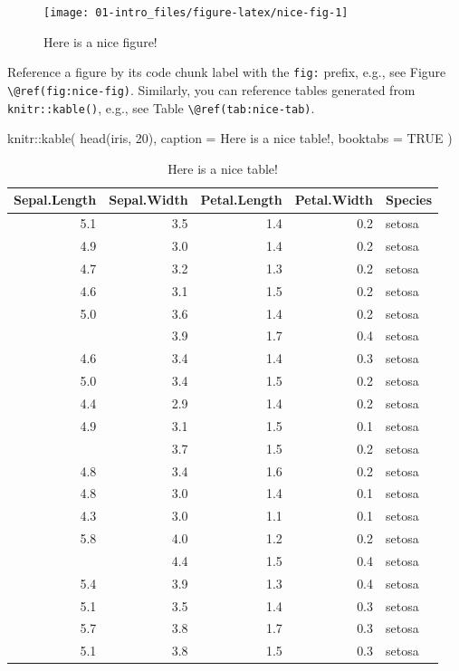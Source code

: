 \documentclass[
]{book}
\newenvironment{Shaded}{\begin{snugshade}}{\end{snugshade}}
\newcommand{\AttributeTok}[1]{\textcolor[rgb]{0.77,0.63,0.00}{#1}}
\newcommand{\ConstantTok}[1]{\textcolor[rgb]{0.00,0.00,0.00}{#1}}
\newcommand{\DecValTok}[1]{\textcolor[rgb]{0.00,0.00,0.81}{#1}}
\newcommand{\FunctionTok}[1]{\textcolor[rgb]{0.00,0.00,0.00}{#1}}
\newcommand{\NormalTok}[1]{#1}
\newcommand{\SpecialCharTok}[1]{\textcolor[rgb]{0.00,0.00,0.00}{#1}}
\newcommand{\StringTok}[1]{\textcolor[rgb]{0.31,0.60,0.02}{#1}}
\begin{document}
\begin{figure}

{\centering \texttt{[image: 01-intro\_files/figure-latex/nice-fig-1]} 

}

\caption{Here is a nice figure!}\label{fig:nice-fig}
\end{figure}

Reference a figure by its code chunk label with the \texttt{fig:} prefix, e.g., see Figure \texttt{\textbackslash{}@ref(fig:nice-fig)}. Similarly, you can reference tables generated from \texttt{knitr::kable()}, e.g., see Table \texttt{\textbackslash{}@ref(tab:nice-tab)}.

\begin{Shaded}
\begin{Highlighting}[]
\NormalTok{knitr}\SpecialCharTok{::}\FunctionTok{kable}\NormalTok{(}
  \FunctionTok{head}\NormalTok{(iris, }\DecValTok{20}\NormalTok{), }\AttributeTok{caption =} \StringTok{\textquotesingle{}Here is a nice table!\textquotesingle{}}\NormalTok{,}
  \AttributeTok{booktabs =} \ConstantTok{TRUE}
\NormalTok{)}
\end{Highlighting}
\end{Shaded}

\begin{table}

\caption{\label{tab:nice-tab}Here is a nice table!}
\centering
\begin{tabular}[t]{rrrrl}
\toprule
Sepal.Length & Sepal.Width & Petal.Length & Petal.Width & Species\\
\midrule
5.1 & 3.5 & 1.4 & 0.2 & setosa\\
4.9 & 3.0 & 1.4 & 0.2 & setosa\\
4.7 & 3.2 & 1.3 & 0.2 & setosa\\
4.6 & 3.1 & 1.5 & 0.2 & setosa\\
5.0 & 3.6 & 1.4 & 0.2 & setosa\\
\addlinespace
5.4 & 3.9 & 1.7 & 0.4 & setosa\\
4.6 & 3.4 & 1.4 & 0.3 & setosa\\
5.0 & 3.4 & 1.5 & 0.2 & setosa\\
4.4 & 2.9 & 1.4 & 0.2 & setosa\\
4.9 & 3.1 & 1.5 & 0.1 & setosa\\
\addlinespace
5.4 & 3.7 & 1.5 & 0.2 & setosa\\
4.8 & 3.4 & 1.6 & 0.2 & setosa\\
4.8 & 3.0 & 1.4 & 0.1 & setosa\\
4.3 & 3.0 & 1.1 & 0.1 & setosa\\
5.8 & 4.0 & 1.2 & 0.2 & setosa\\
\addlinespace
5.7 & 4.4 & 1.5 & 0.4 & setosa\\
5.4 & 3.9 & 1.3 & 0.4 & setosa\\
5.1 & 3.5 & 1.4 & 0.3 & setosa\\
5.7 & 3.8 & 1.7 & 0.3 & setosa\\
5.1 & 3.8 & 1.5 & 0.3 & setosa\\
\bottomrule
\end{tabular}
\end{table}
\end{document}
